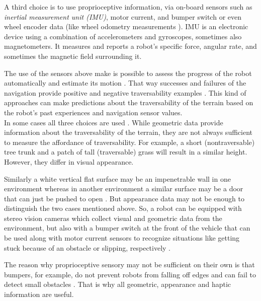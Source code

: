 \documentclass[12pt,a4paper]{report}
\newcommand{\term}{\textit}
\newcommand{\acronym}{\MakeUppercase}
\begin{document}
	A third choice is to use proprioceptive information, via on-board sensors such 
	as \term{inertial measurement unit (\acronym{imu})}, motor current, and bumper 
	switch \cite{Kim} or even wheel encoder data \cite{Lee} (like wheel odometry 
	measurements \cite{Droeschel}). \acronym{imu} is an electronic device using 
	a combination of accelerometers and gyroscopes, sometimes also magnetometers. 
	It measures and reports a robot's specific force, angular rate, and sometimes 
	the magnetic field surrounding it.
	\par
	The use of the sensors above make is possible to assess the progress of the 
	robot automatically and estimate its motion \cite{Droeschel}. That way successes 
	and failures of the navigation provide positive and negative traversability 
	examples \cite{Kim}. This kind of approaches can make predictions about the 
	traversability of the terrain based on the robot's past experiences and 
	navigation sensor values.
	\\
	
	In some cases all three choices are used \cite{Kim, Shneier}. While geometric 
	data provide information about the traversability of the terrain, they are 
	not always sufficient to measure the affordance of traversability. For 
	example, a short (nontraversable) tree trunk and a patch of tall (traversable) 
	grass will result in a similar height. However, they differ in visual 
	appearance. 
	\par 
	Similarly a white vertical flat surface may be an impenetrable wall in one 
	environment whereas in another environment a similar surface may be a door that 
	can just be pushed to open \cite{Ugur}. But appearance data may not be enough 
	to distinguish the two cases mentioned above. So, a robot can be equipped with 
	stereo vision cameras which collect visual and geometric data from the 
	environment, but also with a bumper switch at the front of the vehicle that can 
	be used along with motor current sensors to recognize situations like getting 
	stuck because of an obstacle or slipping, respectively \cite{Kim}.
	\par
	The reason why proprioceptive sensory may not be sufficient on their own is that 
	bumpers, for example, do not prevent robots from falling off edges and can fail 
	to detect small obstacles \cite{HiroseGonet}. That is why all geometric, 
	appearance and haptic information are useful.
	\\\\
	
\end{document}
